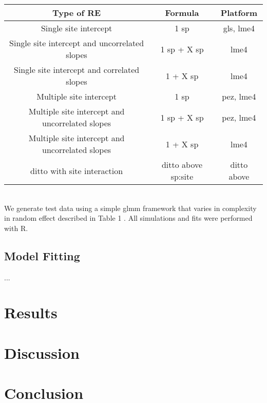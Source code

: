\documentclass[12pt]{article}
\begin{document}
\begin{tabular}{|c|c|c|}
\hline
Type of RE	& Formula	& Platform	\\
\hline
Single site intercept										&	1 \mid sp						& gls, lme4 \\
Single site intercept and uncorrelated slopes		&  1 \mid sp + X \mid sp		& lme4 \\
Single site intercept and correlated slopes 			& 1 + X \mid sp					& lme4 \\
\hline
Multiple site intercept 									&  1 \mid sp 						& pez, lme4 \\
Multiple site intercept and uncorrelated slopes 	&  1 \mid sp + X \mid sp 		& pez, lme4 \\
Multiple site intercept and uncorrelated slopes 	& 	1 + X \mid sp					& lme4 \\
ditto with site interaction								& ditto above \mid sp:site		& ditto above \\
\hline

\end{tabular}
\\


We generate test data using a simple glmm framework that varies in complexity in random effect described in Table 1 . All simulations and fits were performed with R. 

\subsection{Model Fitting}

...


\section{Results}

\section{Discussion}

\section{Conclusion}
\end{document}

